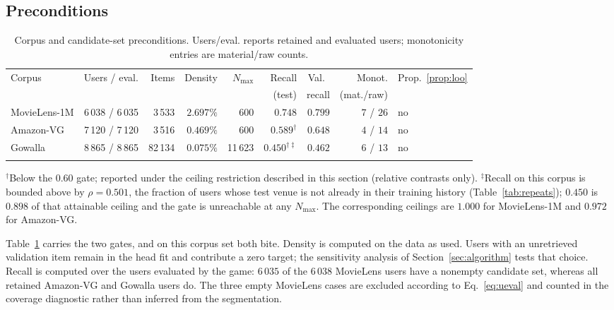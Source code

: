 \documentclass[pdflatex,sn-basic,Numbered]{sn-jnl}
\theoremstyle{plain}
\theoremstyle{definition}
\begin{document}
\subsection{Preconditions}\label{sec:preconditions}

\begin{table}[tbp]
\caption{Corpus and candidate-set preconditions. Users/eval. reports retained
and evaluated users; monotonicity entries are material/raw counts.}
\label{tab:preconditions}
\small
\setlength{\tabcolsep}{3pt}
\begin{tabular}{@{}lrrrrrrrl@{}}
\toprule
Corpus & Users / eval. & Items & Density & $N_{\max}$ & Recall & Val.\ & Monot. & Prop.~\ref{prop:loo} \\
 &  &  &  &  & (test) & recall & (mat./raw) &  \\
\midrule
MovieLens-1M & 6\,038 / 6\,035 & 3\,533  & $2.697\%$ & 600    & $0.748$ & $0.799$ & $7$ / $26$ & no \\
Amazon-VG    & 7\,120 / 7\,120 & 3\,516  & $0.469\%$ & 600    & $0.589^{\dagger}$ & $0.648$ & $4$ / $14$ & no \\
Gowalla      & 8\,865 / 8\,865 & 82\,134 & $0.075\%$ & 11\,623 & $0.450^{\dagger\ddagger}$ & $0.462$ & $6$ / $13$ & no \\
\botrule
\end{tabular}
\smallskip
\noindent\footnotesize $^{\dagger}$Below the $0.60$ gate; reported under the
ceiling restriction described in this section (relative contrasts only).
$^{\ddagger}$Recall on this corpus is bounded above by $\rho = 0.501$, the
fraction of users whose test venue is not already in their training history
(Table~\ref{tab:repeats}); $0.450$ is $0.898$ of that attainable ceiling and
the gate is unreachable at any $N_{\max}$. The corresponding ceilings are
$1.000$ for MovieLens-1M and $0.972$ for Amazon-VG.
\end{table}

Table~\ref{tab:preconditions} carries the two gates, and on this corpus set
both bite. Density is computed on the data as used. Users with an unretrieved
validation item remain in the head fit and contribute a zero target; the
sensitivity analysis of Section~\ref{sec:algorithm} tests that choice. Recall
is computed over the users evaluated by the game: $6\,035$ of the $6\,038$
MovieLens users have a nonempty candidate set, whereas all retained Amazon-VG
and Gowalla users do. The three empty MovieLens cases are excluded according to
Eq.~\eqref{eq:ueval} and counted in the coverage diagnostic rather than inferred
from the segmentation.
\end{document}
